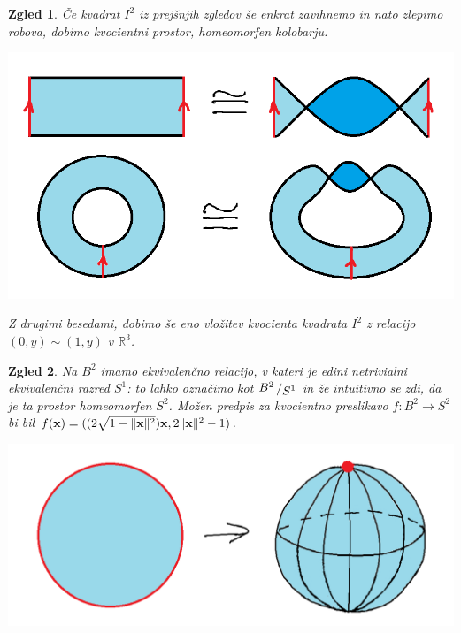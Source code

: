 \documentclass[10pt, a4paper]{article}
\newtheorem{zgled}{Zgled}[section]
\newcommand{\R}{\mathbb {R}}
\newcommand{\quot}[2]{{\raisebox{0.1em}{$#1$}\left/\raisebox{-0.2em}{$#2$}\right.}}
\begin{document}
\begin{zgled}\label{zgl:2}
  Če kvadrat $I^2$ iz prejšnjih zgledov še enkrat zavihnemo in nato zlepimo robova,
  dobimo kvocientni prostor, homeomorfen kolobarju.
  \begin{center}
  \includegraphics[scale=0.4]{zgled3.png}    
  \end{center}
  Z drugimi besedami, dobimo še eno vložitev 
  kvocienta kvadrata $I^2$ z relacijo 
  $(0, y) \sim (1, y)$ v $\R^3$.
\end{zgled}

\begin{zgled}\label{zgl:1}
  Na $B^2$ imamo ekvivalenčno relacijo, v kateri je edini netrivialni ekvivalenčni razred $S^1$:
    to lahko označimo kot $\quot{B^2}{S^1}$ in že intuitivno se zdi, da je ta prostor homeomorfen $S^2$.
    Možen predpis za kvocientno preslikavo $f: B^2 \to S^2$ bi bil
    $f(\vb{x}) = ((2 \sqrt{1 - \|\vb{x}\|^2}) \vb{x}, 2\|\vb{x}\|^2 - 1)$.
    \begin{center}
      \includegraphics[scale=0.4]{zgled4.png}
    \end{center}
\end{zgled}
\end{document}
